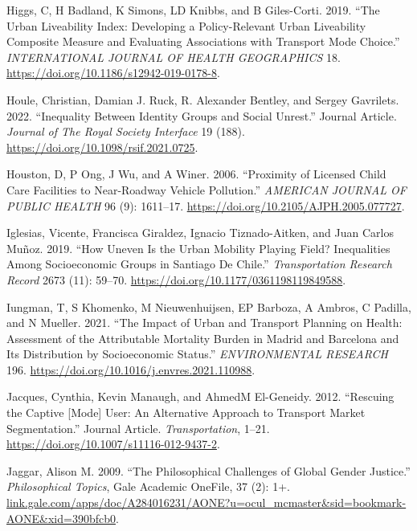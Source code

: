 \documentclass[12pt, oneside]{report}
\newlength{\cslhangindent}
\newlength{\cslentryspacingunit} %
\newenvironment{CSLReferences}[2] %
 {%
  \setlength{\parindent}{0pt}
  \ifodd #1
  \let\oldpar\par
  \def\par{\hangindent=\cslhangindent\oldpar}
  \fi
  \setlength{\parskip}{#2\cslentryspacingunit}
 }%
 {}
\begin{document}
\begin{CSLReferences}{1}{0}
\leavevmode{}%
Higgs, C, H Badland, K Simons, LD Knibbs, and B Giles-Corti. 2019.
{``The {Urban Liveability Index}: Developing a Policy-Relevant Urban
Liveability Composite Measure and Evaluating Associations with Transport
Mode Choice.''} \emph{INTERNATIONAL JOURNAL OF HEALTH GEOGRAPHICS} 18.
\url{https://doi.org/10.1186/s12942-019-0178-8}.

\leavevmode{}%
Houle, Christian, Damian J. Ruck, R. Alexander Bentley, and Sergey
Gavrilets. 2022. {``Inequality Between Identity Groups and Social
Unrest.''} Journal Article. \emph{Journal of The Royal Society
Interface} 19 (188). \url{https://doi.org/10.1098/rsif.2021.0725}.

\leavevmode{}%
Houston, D, P Ong, J Wu, and A Winer. 2006. {``Proximity of Licensed
Child Care Facilities to Near-Roadway Vehicle Pollution.''}
\emph{AMERICAN JOURNAL OF PUBLIC HEALTH} 96 (9): 1611--17.
\url{https://doi.org/10.2105/AJPH.2005.077727}.

\leavevmode{}%
Iglesias, Vicente, Francisca Giraldez, Ignacio Tiznado-Aitken, and Juan
Carlos Muñoz. 2019. {``How {Uneven} Is the {Urban Mobility Playing
Field}? {Inequalities} Among {Socioeconomic Groups} in {Santiago De
Chile}.''} \emph{Transportation Research Record} 2673 (11): 59--70.
\url{https://doi.org/10.1177/0361198119849588}.

\leavevmode{}%
Iungman, T, S Khomenko, M Nieuwenhuijsen, EP Barboza, A Ambros, C
Padilla, and N Mueller. 2021. {``The Impact of Urban and Transport
Planning on Health: {Assessment} of the Attributable Mortality Burden in
{Madrid} and {Barcelona} and Its Distribution by Socioeconomic
Status.''} \emph{ENVIRONMENTAL RESEARCH} 196.
\url{https://doi.org/10.1016/j.envres.2021.110988}.

\leavevmode{}%
Jacques, Cynthia, Kevin Manaugh, and AhmedM El-Geneidy. 2012.
{``Rescuing the Captive {[}Mode{]} User: An Alternative Approach to
Transport Market Segmentation.''} Journal Article.
\emph{Transportation}, 1--21.
\url{https://doi.org/10.1007/s11116-012-9437-2}.

\leavevmode{}%
Jaggar, Alison M. 2009. {``The Philosophical Challenges of Global Gender
Justice.''} \emph{Philosophical Topics}, Gale {Academic OneFile}, 37
(2): 1+.
\href{https://link.gale.com/apps/doc/A284016231/AONE?u=ocul_mcmaster\&sid=bookmark-AONE\&xid=390bfcb0}{link.gale.com/apps/doc/A284016231/AONE?u=ocul\_mcmaster\&sid=bookmark-AONE\&xid=390bfcb0}.


\end{CSLReferences}
\end{document}
